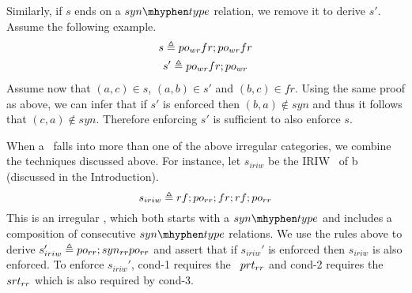 Similarly, if $s$ ends on a $\syntype$ relation, we remove it to derive $s'$.
Assume the following example.
\begin{gather*}
    s\triangleq po_{wr} fr; po_{wr} fr\\
    s' \triangleq po_{wr} fr; po_{wr}
\end{gather*}
Assume now that $(a,c) \in s$,  $(a,b) \in s'$ and $(b, c) \in fr$.
Using the same proof as above, we can infer that if $s'$ is enforced then $(b,a) \notin syn$ and thus it follows that $(c, a) \notin syn$. Therefore enforcing $s'$ is sufficient to also enforce $s$.

When a \synpat\ falls into more than one of the above irregular categories, we combine the techniques discussed above. For instance, let $s_{iriw}$ be the IRIW \synpat\ of b (discussed in the Introduction). 
\begin{equation*}
    s_{iriw} \triangleq rf;po_{rr};fr;rf;po_{rr}
\end{equation*}
This is an irregular \synpat, which both starts with a $\syntype$ and includes a composition of consecutive $\syntype$ relations. We use the rules above to derive $s_{iriw}'\triangleq po_{rr};syn_{rr}po_{rr}$ and assert that if $s_{iriw}'$ is enforced then $s_{iriw}$ is also enforced.
To enforce $s_{iriw}'$, cond-1 requires the \prt\ $prt_{rr}$ and cond-2 requires the \srt\ $srt_{rr}$ which is also required by cond-3.











